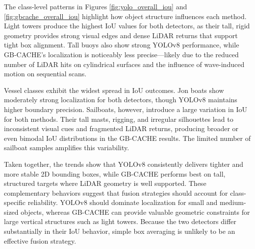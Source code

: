\documentclass{erauthesis}
\begin{document}

The class-level patterns in Figures \ref{fig:yolo_overall_iou} and \ref{fig:gbcache_overall_iou} highlight how object structure influences each method. Light towers produce the highest IoU values for both detectors, as their tall, rigid geometry provides strong visual edges and dense LiDAR returns that support tight box alignment. Tall buoys also show strong YOLOv8 performance, while GB-CACHE’s localization is noticeably less precise—likely due to the reduced number of LiDAR hits on cylindrical surfaces and the influence of wave-induced motion on sequential scans. 

Vessel classes exhibit the widest spread in IoU outcomes. Jon boats show moderately strong localization for both detectors, though YOLOv8 maintains higher boundary precision. Sailboats, however, introduce a large variation in IoU for both methods. Their tall masts, rigging, and irregular silhouettes lead to inconsistent visual cues and fragmented LiDAR returns, producing broader or even bimodal IoU distributions in the GB-CACHE results. The limited number of sailboat samples  amplifies this variability.

Taken together, the trends show that YOLOv8 consistently delivers tighter and more stable 2D bounding boxes, while GB-CACHE performs best on tall, structured targets where LiDAR geometry is well supported. These complementary behaviors suggest that fusion strategies should account for class-specific reliability. YOLOv8 should dominate localization for small and medium-sized objects, whereas GB-CACHE can provide valuable geometric constraints for large vertical structures such as light towers. Because the two detectors differ substantially in their IoU behavior, simple box averaging is unlikely to be an effective fusion strategy.
\end{document}
